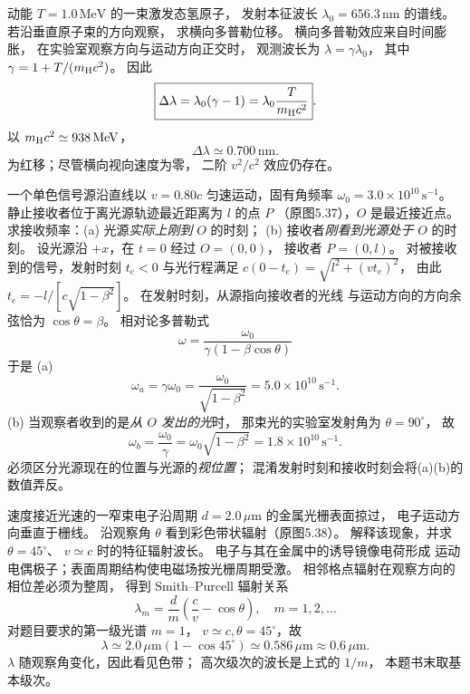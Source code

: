 动能 $T=1.0\,\mathrm{MeV}$ 的一束激发态氢原子，
发射本征波长
$\lambda_0=656.3\,\mathrm{nm}$ 的谱线。
若沿垂直原子束的方向观察，
求横向多普勒位移。
\exsolution
横向多普勒效应来自时间膨胀，
在实验室观察方向与运动方向正交时，
观测波长为
$\lambda=\gamma\lambda_0$，
其中 $\gamma=1+T/(m_{\rm H}c^2)$。
因此
\[
 \boxed{\Delta\lambda=
 \lambda_0(\gamma-1)
 =\lambda_0\frac{T}{m_{\rm H}c^2}}.
\]
以 $m_{\rm H}c^2\simeq938\,\mathrm{MeV}$，
\[
 \boxed{\Delta\lambda\simeq0.700\,\mathrm{nm}}.
\]
\excheck 为红移；尽管横向视向速度为零，
二阶 $v^2/c^2$ 效应仍存在。

一个单色信号源沿直线以
$v=0.80c$ 匀速运动，固有角频率
$\omega_0=3.0\times10^{10}\,\mathrm{s^{-1}}$。
静止接收者位于离光源轨迹最近距离为 $l$ 的点 $P$
（原图5.37），$O$ 是最近接近点。
求接收频率：(a) 光源\emph{实际上刚到} $O$ 的时刻；
(b) 接收者\emph{刚看到光源处于} $O$ 的时刻。
\exsolution
设光源沿 $+x$，在 $t=0$ 经过 $O=(0,0)$，
接收者 $P=(0,l)$。
对被接收到的信号，发射时刻
$t_e<0$ 与光行程满足
$c(0-t_e)=\sqrt{l^2+(vt_e)^2}$，
由此
$t_e=-l/[c\sqrt{1-\beta^2}]$。
在发射时刻，从源指向接收者的光线
与运动方向的方向余弦恰为 $\cos\theta=\beta$。
相对论多普勒式
\[
 \omega=\frac{\omega_0}{\gamma(1-\beta\cos\theta)}
\]
于是 (a)
\[
 \boxed{\omega_a=\gamma\omega_0
 =\frac{\omega_0}{\sqrt{1-\beta^2}}
 =5.0\times10^{10}\,\mathrm{s^{-1}}}.
\]
(b) 当观察者收到的是\emph{从 $O$ 发出的光}时，
那束光的实验室发射角为 $\theta=90^\circ$，
故
\[
 \boxed{\omega_b=\frac{\omega_0}{\gamma}
 =\omega_0\sqrt{1-\beta^2}
 =1.8\times10^{10}\,\mathrm{s^{-1}}}.
\]
\excheck 必须区分光源现在的位置与光源的\emph{视位置}；
混淆发射时刻和接收时刻会将(a)(b)的数值弄反。

速度接近光速的一窄束电子沿周期
$d=2.0\,\mu\mathrm m$ 的金属光栅表面掠过，
电子运动方向垂直于栅线。
沿观察角 $\theta$ 看到彩色带状辐射（原图5.38）。
解释该现象，并求 $\theta=45^\circ$、
$v\simeq c$ 时的特征辐射波长。
\exsolution
电子与其在金属中的诱导镜像电荷形成
运动电偶极子；表面周期结构使电磁场按光栅周期受激。
相邻格点辐射在观察方向的相位差必须为整周，
得到 Smith--Purcell 辐射关系
\[
 \boxed{\lambda_m=\frac d m
 \left(\frac c v-\cos\theta\right)},\quad
 m=1,2,\ldots
\]
对题目要求的第一级光谱 $m=1$，
$v\simeq c,\theta=45^\circ$，故
\[
 \boxed{\lambda\simeq
 2.0\,\mu\mathrm m(1-\cos45^\circ)
 \simeq0.586\,\mu\mathrm m\approx0.6\,\mu\mathrm m}.
\]
\excheck $\lambda$ 随观察角变化，因此看见色带；
高次级次的波长是上式的 $1/m$，
本题书末取基本级次。

